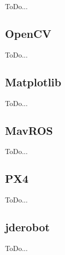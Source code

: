ToDo...

\subsection{OpenCV}
\label{subsec:opencv}

ToDo...

\subsection{Matplotlib}
\label{subsec:matplotlib}

ToDo...

\subsection{MavROS}
\label{subsec:mavros}

ToDo...

\subsection{PX4}
\label{subsec:px4}

ToDo...

\subsection{jderobot}
\label{subsec:jderobot}

ToDo...